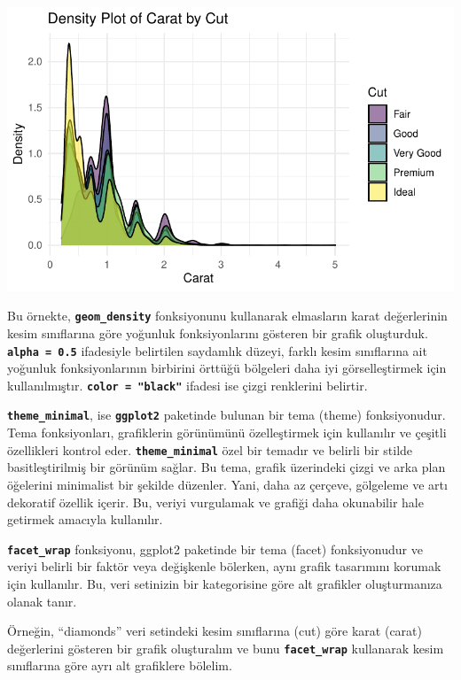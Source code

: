 \documentclass[
  letterpaper,
  DIV=11,
  numbers=noendperiod]{scrreprt}
\begin{document}
\includegraphics{ggplot2_files/figure-pdf/unnamed-chunk-4-1.pdf}

Bu örnekte, \textbf{\texttt{geom\_density}} fonksiyonunu kullanarak
elmasların karat değerlerinin kesim sınıflarına göre yoğunluk
fonksiyonlarını gösteren bir grafik oluşturduk.
\textbf{\texttt{alpha\ =\ 0.5}} ifadesiyle belirtilen saydamlık düzeyi,
farklı kesim sınıflarına ait yoğunluk fonksiyonlarının birbirini örttüğü
bölgeleri daha iyi görselleştirmek için kullanılmıştır.
\textbf{\texttt{color\ =\ "black"}} ifadesi ise çizgi renklerini
belirtir.

\textbf{\texttt{theme\_minimal}}, ise \textbf{\texttt{ggplot2}}
paketinde bulunan bir tema (theme) fonksiyonudur. Tema fonksiyonları,
grafiklerin görünümünü özelleştirmek için kullanılır ve çeşitli
özellikleri kontrol eder. \textbf{\texttt{theme\_minimal}} özel bir
temadır ve belirli bir stilde basitleştirilmiş bir görünüm sağlar. Bu
tema, grafik üzerindeki çizgi ve arka plan öğelerini minimalist bir
şekilde düzenler. Yani, daha az çerçeve, gölgeleme ve artı dekoratif
özellik içerir. Bu, veriyi vurgulamak ve grafiği daha okunabilir hale
getirmek amacıyla kullanılır.

\textbf{\texttt{facet\_wrap}} fonksiyonu, ggplot2 paketinde bir tema
(facet) fonksiyonudur ve veriyi belirli bir faktör veya değişkenle
bölerken, aynı grafik tasarımını korumak için kullanılır. Bu, veri
setinizin bir kategorisine göre alt grafikler oluşturmanıza olanak
tanır.

Örneğin, ``diamonds'' veri setindeki kesim sınıflarına (cut) göre karat
(carat) değerlerini gösteren bir grafik oluşturalım ve bunu
\textbf{\texttt{facet\_wrap}} kullanarak kesim sınıflarına göre ayrı alt
grafiklere bölelim.
\end{document}
